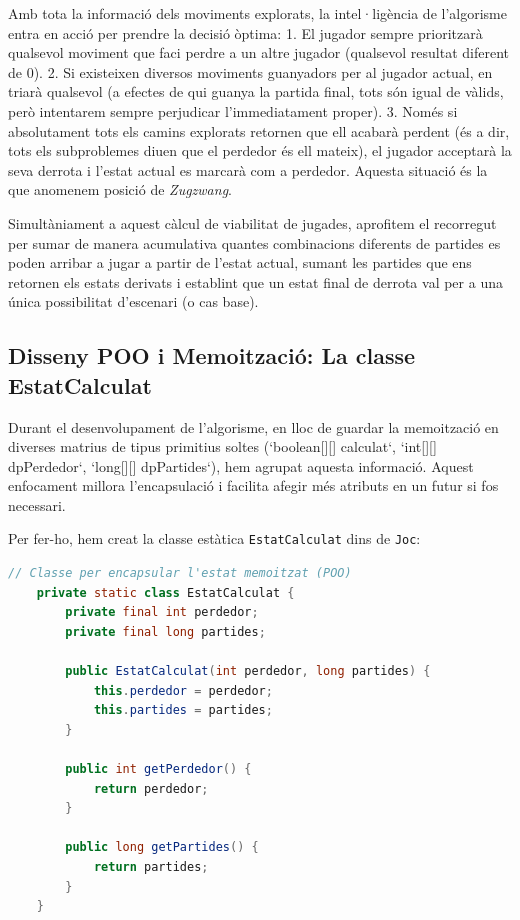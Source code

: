 \documentclass[compsoc, a4paper]{IEEEtran}
\begin{document}
  Amb tota la informació dels moviments explorats, la intel·ligència de l'algorisme entra en acció per prendre la decisió òptima:
  1. El jugador sempre prioritzarà qualsevol moviment que faci perdre a un altre jugador (qualsevol resultat diferent de 0). 
  2. Si existeixen diversos moviments guanyadors per al jugador actual, en triarà qualsevol (a efectes de qui guanya la partida final, tots són igual de vàlids, però intentarem sempre perjudicar l'immediatament proper).
  3. Només si absolutament tots els camins explorats retornen que ell acabarà perdent (és a dir, tots els subproblemes diuen que el perdedor és ell mateix), el jugador acceptarà la seva derrota i l'estat actual es marcarà com a perdedor. Aquesta situació és la que anomenem posició de \textit{Zugzwang}.

Simultàniament a aquest càlcul de viabilitat de jugades, aprofitem el recorregut per sumar de manera acumulativa quantes combinacions diferents de partides es poden arribar a jugar a partir de l'estat actual, sumant les partides que ens retornen els estats derivats i establint que un estat final de derrota val per a una única possibilitat d'escenari (o cas base).

\subsection{Disseny POO i Memoització: La classe EstatCalculat}

Durant el desenvolupament de l'algorisme, en lloc de guardar la memoització en diverses matrius de tipus primitius soltes (`boolean[][] calculat`, `int[][] dpPerdedor`, `long[][] dpPartides`), hem agrupat aquesta informació. Aquest enfocament millora l'encapsulació i facilita afegir més atributs en un futur si fos necessari.

Per fer-ho, hem creat la classe estàtica \texttt{EstatCalculat} dins de \texttt{Joc}:

\begin{lstlisting}[language=Java, basicstyle=\tiny\ttfamily]
    // Classe per encapsular l'estat memoitzat (POO)
    private static class EstatCalculat {
        private final int perdedor;
        private final long partides;

        public EstatCalculat(int perdedor, long partides) {
            this.perdedor = perdedor;
            this.partides = partides;
        }

        public int getPerdedor() {
            return perdedor;
        }

        public long getPartides() {
            return partides;
        }
    }
\end{lstlisting}
\end{document}
